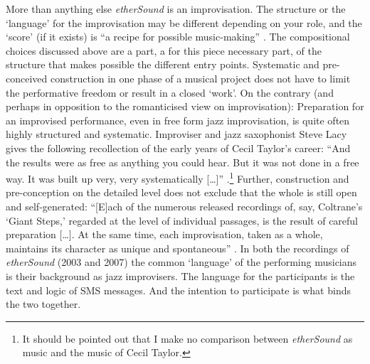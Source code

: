 More than anything else \emph{etherSound} is an improvisation. The structure or the `language' for the improvisation may be different depending on your role, and the `score' (if it exists) is ``a recipe for possible music-making'' \citep[Evan Parker, as cited in][p. 81]{bailey92}. The compositional choices discussed above are a part, a for this piece necessary part, of the structure that makes possible the different entry points. Systematic and pre-conceived construction in one phase of a musical project does not have to limit the performative freedom or result in a closed `work'. On the contrary (and perhaps in opposition to the romanticised view on improvisation): Preparation for an improvised performance, even in free form jazz improvisation, is quite often highly structured and systematic. Improviser and jazz saxophonist Steve Lacy gives the following recollection of the early years of Cecil Taylor's career: ``And the results were as free as anything you could hear. But it was not done in a free way. It was built up very, very systematically [\ldots]'' \citep[Cited in][p.  81]{bailey92}.\footnote{It should be pointed out   that I make no comparison between \emph{etherSound} as music and the   music of Cecil Taylor.} Further, construction and pre-conception on the detailed level does not exclude that the whole is still open and self-generated: ``[E]ach of the numerous released recordings of, say, Coltrane's `Giant Steps,' regarded at the level of individual passages, is the result of careful preparation [\ldots]. At the same time, each improvisation, taken as a whole, maintains its character as unique and spontaneous'' \citep[p.  108]{lewis-1}. In both the recordings of \emph{etherSound} (2003 and 2007) the common `language' of the performing musicians is their background as jazz improvisers.
The language for the participants is the text and logic of SMS messages. And the intention to participate is what binds the two together. 

